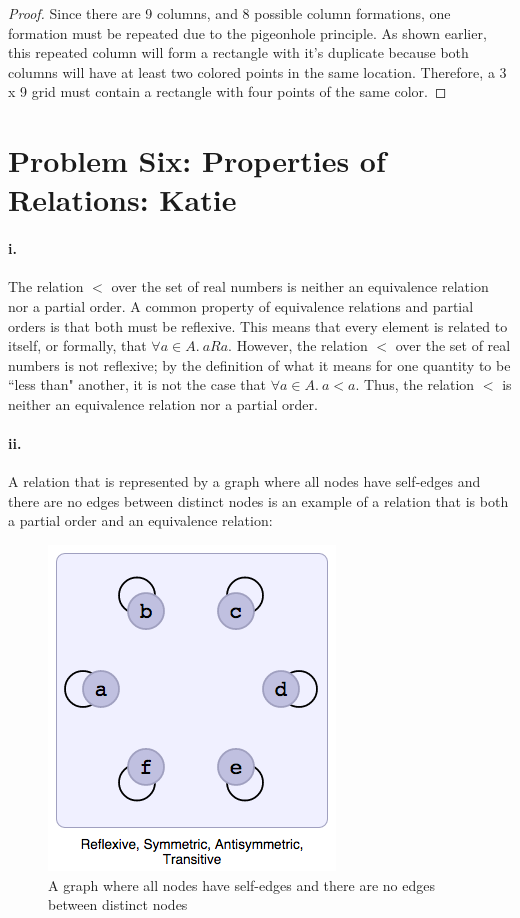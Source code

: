\documentclass[10pt,letter]{article}
\begin{document}
\begin{proof}
Since there are 9 columns, and 8 possible column formations, one formation must be repeated due to the pigeonhole principle. As shown earlier, this repeated column will form a rectangle with it's duplicate because both columns will have at least two colored points in the same location. Therefore, a 3 x 9 grid must contain a rectangle with four points of the same color. 
\end{proof}

\pagebreak
\section*{Problem Six: Properties of Relations: Katie}

\paragraph{i.} The relation $<$ over the set of real numbers is neither an equivalence relation nor a partial order. A common property of equivalence relations and partial orders is that both must be reflexive. This means that every element is related to itself, or formally, that $\forall a \in A.\ aRa$. However, the relation $<$ over the set of real numbers is not reflexive; by the definition of what it means for one quantity to be ``less than" another, it is not the case that $\forall a \in A.\ a<a$. Thus, the relation $<$ is neither an equivalence relation nor a partial order. 

\paragraph{ii.} A relation that is represented by a graph where all nodes have self-edges and there are no edges between distinct nodes is an example of a relation that is both a partial order and an equivalence relation:

\begin{figure}[h]
\centering
  \includegraphics[width=0.45\linewidth]{hw4_6ii.png}
  \caption{A graph where all nodes have self-edges and there are no edges between distinct nodes}
  \label{fig:q6ii}
\end{figure}
\end{document}
